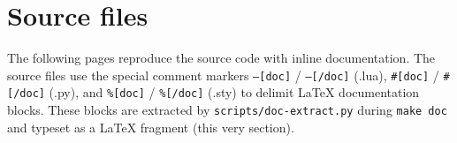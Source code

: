 \documentclass{article}
\begin{document}
\section{Source files}

The following pages reproduce the source code with inline
documentation.  The source files use the special comment markers
\texttt{--[doc]} / \texttt{--[/doc]} (\textsf{.lua}),
\texttt{\#[doc]} / \texttt{\#[/doc]} (\textsf{.py}), and
\texttt{\%[doc]} / \texttt{\%[/doc]} (\textsf{.sty}) to delimit
\LaTeX{} documentation blocks.  These blocks are extracted by
\texttt{scripts/doc-extract.py} during \texttt{make doc} and
typeset as a \LaTeX{} fragment (this very section).


\end{document}
